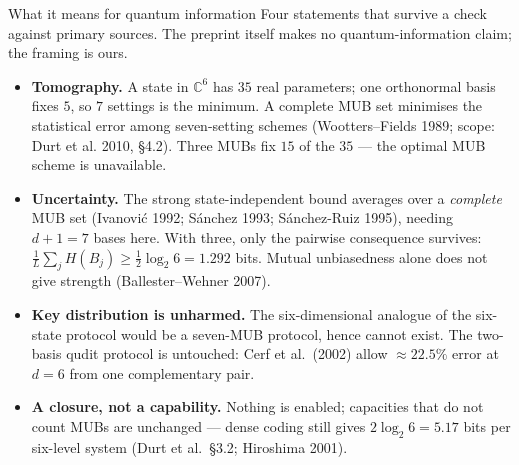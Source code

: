\documentclass[aspectratio=169,10pt]{beamer}
\newcommand{\C}{\mathbb{C}}
\begin{document}
\begin{frame}{What it means for quantum information}
  \small
  {\footnotesize\color{ink!60}Four statements that survive a check against primary sources. The
  preprint itself makes no quantum-information claim; the framing is ours.}
  \vspace{1mm}
  \begin{itemize}\setlength{\itemsep}{2.2mm}
    \item \textbf{Tomography.} A state in $\C^6$ has $35$ real parameters; one orthonormal basis
      fixes $5$, so $7$ settings is the minimum. A complete MUB set minimises the statistical error
      among seven-setting schemes (Wootters--Fields 1989; scope: Durt et al. 2010, \S4.2).
      Three MUBs fix $15$ of the $35$ --- the optimal MUB scheme is unavailable.
    \item \textbf{Uncertainty.} The strong state-independent bound averages over a \emph{complete}
      MUB set (Ivanovi\'c 1992; S\'anchez 1993; S\'anchez-Ruiz 1995), needing $d+1=7$ bases here.
      With three, only the pairwise consequence survives: $\frac1L\sum_j H(B_j)\ge\frac12\log_2 6
      =1.292$ bits. Mutual unbiasedness alone does not give strength (Ballester--Wehner 2007).
    \item \textbf{Key distribution is unharmed.} The six-dimensional analogue of the six-state
      protocol would be a seven-MUB protocol, hence cannot exist. The two-basis qudit protocol is
      untouched: Cerf et al.\ (2002) allow $\approx22.5\%$ error at $d=6$ from one complementary
      pair.
    \item \textbf{A closure, not a capability.} Nothing is enabled; capacities that do not count
      MUBs are unchanged --- dense coding still gives $2\log_2 6=5.17$ bits per six-level system
      (Durt et al.\ \S3.2; Hiroshima 2001).
  \end{itemize}
\end{frame}
\end{document}
